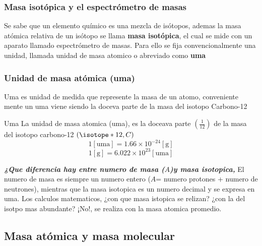 \subsubsection*{Masa isotópica y el espectrómetro de masas}
Se sabe que un elemento químico es una mezcla de isótopos, ademas la masa atómica relativa de un isótopo se llama \textbf{masa isotópica}, el cual se mide con un aparato llamado espectrómetro de masas. Para ello se fija convencionalmente una unidad, llamada unidad de masa atomico o abreviado como \textbf{uma}
\subsubsection*{Unidad de masa atómica (\textbf{uma})}
Uma es unidad de medida que represente la masa de un atomo, conveniente mente un uma viene siendo la doceva parte de la masa del isotopo Carbono-12
\begin{Theorem*} {Uma}
	La unidad de masa atomica (uma), es la doceava parte $\left(\frac{1}{12}\right)$ de la masa del isotopo carbono-12 $\left(\isotope*{12,C}\right)$
	$$ 1 [\text{uma}] = 1.66\times10^{-24}[\text{g}] $$
	$$ 1[\text{g}]=6.022\times10^23 [\text{uma}] $$
\end{Theorem*} 
\textbf{\textit{¿Que diferencia hay entre numero de masa ($A$)y masa isotopica, }} El numero de masa es siempre un numero entero ($A$= numero protones + numero de neutrones), mientras que la masa isotopica es un numero decimal y se expresa en uma. Los calculos matematicos, ¿con que masa istopica se relizan? ¿con la del isotpo mas abundante? ¡No!, se realiza con la masa atomica promedio.
\subsection*{Masa atómica y masa molecular}
